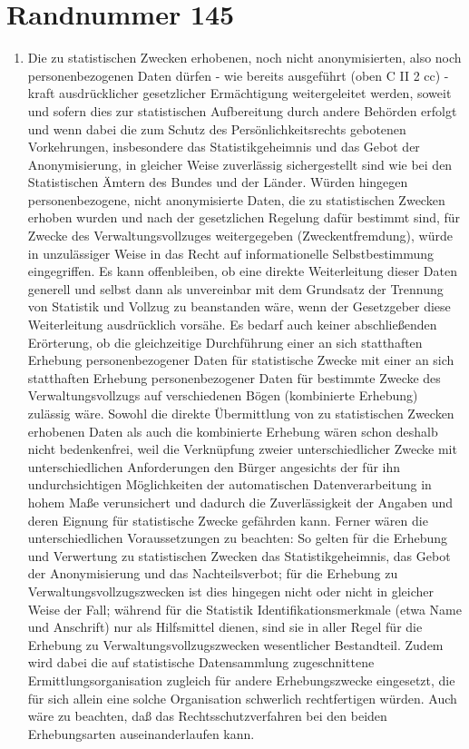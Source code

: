     \section{Randnummer 145}
        \begin{enumerate}[label=\arabic*,start=145]
            \item Die zu statistischen Zwecken erhobenen, noch nicht anonymisierten, also noch personenbezogenen Daten dürfen - wie bereits ausgeführt (oben C II 2 cc) - kraft ausdrücklicher gesetzlicher Ermächtigung weitergeleitet werden, soweit und sofern dies zur statistischen Aufbereitung durch andere Behörden erfolgt und wenn dabei die zum Schutz des Persönlichkeitsrechts gebotenen Vorkehrungen, insbesondere das Statistikgeheimnis und das Gebot der Anonymisierung, in gleicher Weise zuverlässig sichergestellt sind wie bei den Statistischen Ämtern des Bundes und der Länder. Würden hingegen personenbezogene, nicht anonymisierte Daten, die zu statistischen Zwecken erhoben wurden und nach der gesetzlichen Regelung dafür bestimmt sind, für Zwecke des Verwaltungsvollzuges weitergegeben (Zweckentfremdung), würde in unzulässiger Weise in das Recht auf informationelle Selbstbestimmung eingegriffen. Es kann offenbleiben, ob eine direkte Weiterleitung dieser Daten generell und selbst dann als unvereinbar mit dem Grundsatz der Trennung von Statistik und Vollzug zu beanstanden wäre, wenn der Gesetzgeber diese Weiterleitung ausdrücklich vorsähe. Es bedarf auch keiner abschließenden Erörterung, ob die gleichzeitige Durchführung einer an sich statthaften Erhebung personenbezogener Daten für statistische Zwecke mit einer an sich statthaften Erhebung personenbezogener Daten für bestimmte Zwecke des Verwaltungsvollzugs auf verschiedenen Bögen (kombinierte Erhebung) zulässig wäre. Sowohl die direkte Übermittlung von zu statistischen Zwecken erhobenen Daten als auch die kombinierte Erhebung wären schon deshalb nicht bedenkenfrei, weil die Verknüpfung zweier unterschiedlicher Zwecke mit unterschiedlichen Anforderungen den Bürger angesichts der für ihn undurchsichtigen Möglichkeiten der automatischen Datenverarbeitung in hohem Maße verunsichert und dadurch die Zuverlässigkeit der Angaben und deren Eignung für statistische Zwecke gefährden kann. Ferner wären die unterschiedlichen Voraussetzungen zu beachten: So gelten für die Erhebung und Verwertung zu statistischen Zwecken das Statistikgeheimnis, das Gebot der Anonymisierung und das Nachteilsverbot; für die Erhebung zu Verwaltungsvollzugszwecken ist dies hingegen nicht oder nicht in gleicher Weise der Fall; während für die Statistik Identifikationsmerkmale (etwa Name und Anschrift) nur als Hilfsmittel dienen, sind sie in aller Regel für die Erhebung zu Verwaltungsvollzugszwecken wesentlicher Bestandteil. Zudem wird dabei die auf statistische Datensammlung zugeschnittene Ermittlungsorganisation zugleich für andere Erhebungszwecke eingesetzt, die für sich allein eine solche Organisation schwerlich rechtfertigen würden. Auch wäre zu beachten, daß das Rechtsschutzverfahren bei den beiden Erhebungsarten auseinanderlaufen kann.
        \end{enumerate}